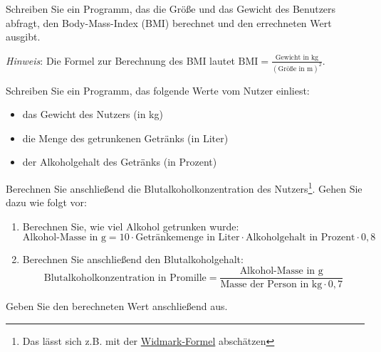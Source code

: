 \documentclass[11pt, a4paper, oneside]{article}
\begin{document}
	
	Schreiben Sie ein Programm, das die Größe und das Gewicht des Benutzers abfragt, den Body-Mass-Index (BMI) berechnet und den errechneten Wert ausgibt.
	
	\emph{Hinweis}: Die Formel zur Berechnung des BMI lautet $\mathrm{BMI} = \frac{\text{Gewicht in kg}}{\left(\text{Größe in m}\right)^2}$.
	
	
	Schreiben Sie ein Programm, das folgende Werte vom Nutzer einliest:
	\begin{itemize}
		\item das Gewicht des Nutzers (in kg)
		\item die Menge des getrunkenen Getränks (in Liter)
		\item der Alkoholgehalt des Getränks (in Prozent)
	\end{itemize}
	Berechnen Sie anschließend die Blutalkoholkonzentration des Nutzers\footnote{Das lässt sich z.B. mit der \href{https://de.wikipedia.org/wiki/Blutalkoholkonzentration\#Widmark-Formel}{Widmark-Formel} abschätzen}.
	Gehen Sie dazu wie folgt vor:
	
	\begin{enumerate}
		\item Berechnen Sie, wie viel Alkohol getrunken wurde: $$\text{Alkohol-Masse in g} = 10 \cdot \text{Getränkemenge in Liter} \cdot \text{Alkoholgehalt in Prozent} \cdot 0,8$$
		\item Berechnen Sie anschließend den Blutalkoholgehalt: $$\text{Blutalkoholkonzentration in Promille} = \frac{\text{Alkohol-Masse in g}}{\text{Masse der Person in kg} \cdot 0,7}$$
	\end{enumerate}
	
	Geben Sie den berechneten Wert anschließend aus.
\end{document}

